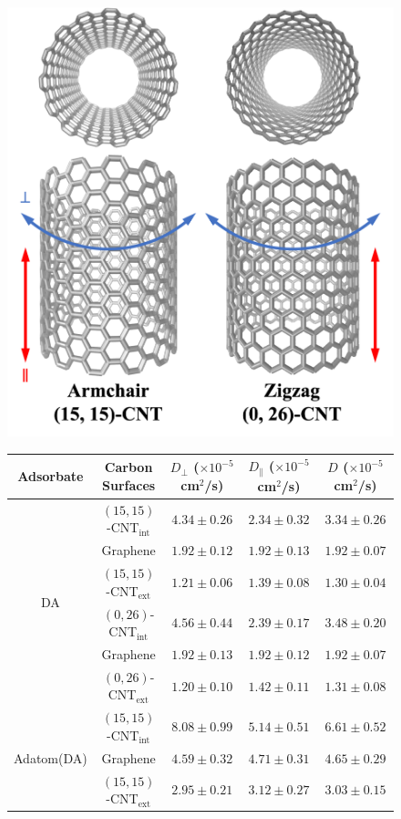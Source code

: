 \documentclass[molecules,article,accept,pdftex,moreauthors]{Definitions/mdpi}
\begin{document}
\begin{figure}[H]
    \footnotesize
    \includegraphics[width=.4\textwidth]{Methods/chirality/fig_3.png}\\
    \begin{tabular}{cc|cc|c}
        \toprule
        Adsorbate &Carbon Surfaces & $D_\perp$ ($\times10^{-5}$ cm$^2$/s) & $D_\parallel$ ($\times10^{-5}$ cm$^2$/s) & $D$ ($\times10^{-5}$ cm$^2$/s) \\
        \midrule
        \multirow{6}{*}{DA} &	$(15,15)$-CNT$_\mathrm{int}$ &   $4.34   \pm 0.26$   &   $2.34   \pm 0.32$  &   $3.34   \pm 0.26$\\
                                    &	Graphene              &   $1.92   \pm 0.12$   &   $1.92   \pm 0.13$  &   $1.92   \pm 0.07$\\
                                    &	$(15,15)$-CNT$_\mathrm{ext}$ &   $1.21   \pm 0.06$   &   $1.39   \pm 0.08$  &   $1.30   \pm 0.04$\\
                                    \cmidrule{2-5}
                                    &   $(0,26)$-CNT$_\mathrm{int}$ &    $4.56   \pm 0.44$   &   $2.39   \pm 0.17$  &   $3.48 \pm 0.20 $ \\
                                    &   Graphene              &    $1.92   \pm 0.13$   &   $1.92   \pm 0.12$  &   $1.92 \pm 0.07 $ \\
                                    &   $(0,26)$-CNT$_\mathrm{ext}$ &    $1.20    \pm 0.10$    &   $1.42   \pm 0.11$  &   $1.31	\pm	0.08$ \\
        \midrule
        \multirow{6}{*}{Adatom(DA)} &	$(15,15)$-CNT$_\mathrm{int}$ &   $8.08   \pm   0.99$   &   $5.14   \pm 0.51$ &   $6.61   \pm 0.52$ \\
                                    &	Graphene              &   $4.59	  \pm	0.32$	&	$4.71	\pm	0.31$ &   $4.65   \pm 0.29$ \\
                                    &	$(15,15)$-CNT$_\mathrm{ext}$ &   $2.95	  \pm	0.21$	&	$3.12	\pm	0.27$ &   $3.03   \pm 0.15$ \\

\end{tabular}
\end{figure}
\end{document}

